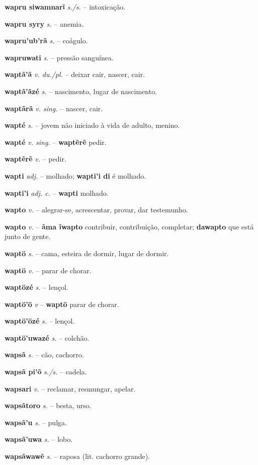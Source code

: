 \textbf{wapru siwamnarĩ} \textit{s./s.} -- intoxicação.

\textbf{wapru syry} \textit{s.} -- anemia.

\textbf{wapru'ub'rã} \textit{s.} -- coágulo.

\textbf{wapruwati} \textit{s.} -- pressão sanguínea.

\textbf{waptã'ã} \textit{v. du./pl.} -- deixar cair, nascer, cair.

\textbf{waptã'ãzé} \textit{s.} -- nascimento, lugar de nascimento.

\textbf{waptãrã} \textit{v. sing.} -- nascer, cair.

\textbf{wapté} \textit{s.} -- jovem não iniciado à vida de adulto, menino.

\textbf{wapté} \textit{v. sing.} -- \textbf{waptẽrẽ} pedir.

\textbf{waptẽrẽ} \textit{v.} -- pedir.

\textbf{wapti} \textit{adj.} -- molhado; \textbf{wapti'i di} é molhado.

\textbf{wapti'i} \textit{adj. c.} -- \textbf{wapti} molhado.

\textbf{wapto} \textit{v.} -- alegrar-se, acrescentar, provar, dar testemunho.

\textbf{wapto} \textit{v.} -- \textbf{ãma ĩwapto} contribuir, contribuição, completar; \textbf{dawapto} que está junto de gente.

\textbf{waptö} \textit{s.} -- cama, esteira de dormir, lugar de dormir.

\textbf{waptö} \textit{v.} -- parar de chorar.

\textbf{waptözé} \textit{s.} -- lençol.

\textbf{waptö'ö} \textit{v} -- \textbf{waptö} parar de chorar.

\textbf{waptö'özé} \textit{s.} -- lençol.

\textbf{waptö'uwazé} \textit{s.} -- colchão.

\textbf{wapsã} \textit{s.} -- cão, cachorro.

\textbf{wapsã pi'õ} \textit{s./s.} -- cadela.

\textbf{wapsari} \textit{v.} -- reclamar, resmungar, apelar.

\textbf{wapsãtoro} \textit{s.} -- besta, urso.

\textbf{wapsã'u} \textit{s.} -- pulga.

\textbf{wapsã'uwa} \textit{s.} -- lobo.

\textbf{wapsãwawẽ} \textit{s.} -- raposa (lit. cachorro grande).


